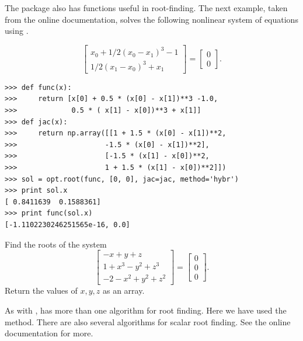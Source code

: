 The  package also has functions useful in root-finding.
The next example, taken from the online documentation, solves the following nonlinear system of equations using .

\[
\begin{bmatrix}
	x_{0} + 1/2 ( x_{0} - x_{1} )^{3} - 1 \\
	1/2(x_{1}-x_{0})^{3} + x_{1}
\end{bmatrix} =
\begin{bmatrix}
	0 \\
	0
\end{bmatrix}.
\]

\begin{lstlisting}
>>> def func(x):
>>>     return [x[0] + 0.5 * (x[0] - x[1])**3 -1.0,
>>>             0.5 * ( x[1] - x[0])**3 + x[1]]
>>> def jac(x):
>>>     return np.array([[1 + 1.5 * (x[0] - x[1])**2,
>>>                     -1.5 * (x[0] - x[1])**2],
>>>                     [-1.5 * (x[1] - x[0])**2,
>>>                     1 + 1.5 * (x[1] - x[0])**2]])
>>> sol = opt.root(func, [0, 0], jac=jac, method='hybr')
>>> print sol.x
[ 0.8411639  0.1588361]
>>> print func(sol.x)
[-1.1102230246251565e-16, 0.0]
\end{lstlisting}

\begin{problem}
Find the roots of the system
\[
\begin{bmatrix}
	-x+y+z \\
	1+x^3-y^2+z^3\\
	-2-x^2+y^2+z^2
\end{bmatrix} =
\begin{bmatrix}
	0 \\
	0 \\
	0
\end{bmatrix} .
\]
Return the values of $x,y,z$ as an array.
\end{problem}



As with ,  has more than one algorithm for root finding.
Here we have used the  method. There are also several algorithms for scalar root finding. See the online documentation for more.

